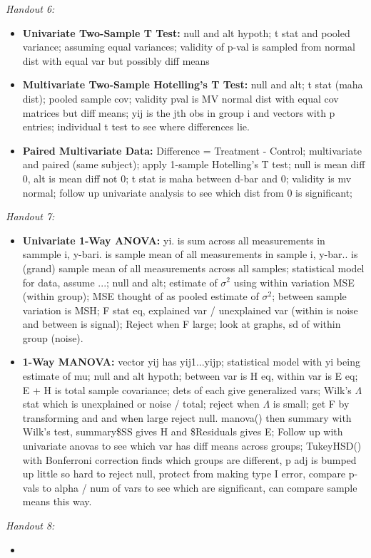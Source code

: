 \documentclass[9pt]{extarticle}
\begin{document}
\textit{Handout 6:}
\begin{itemize}
    \item \textbf{Univariate Two-Sample T Test:} null and alt hypoth; t stat and 
    pooled variance; assuming equal variances; validity of p-val is sampled from 
    normal dist with equal var but possibly diff means
    \item \textbf{Multivariate Two-Sample Hotelling's T Test:} null and alt; 
    t stat (maha dist); pooled sample cov; validity pval is MV normal dist with 
    equal cov matrices but diff means; yij is the jth obs in group i and vectors 
    with p entries; individual t test to see where differences lie.
    \item \textbf{Paired Multivariate Data:} Difference = Treatment - Control;
    multivariate and paired (same subject); apply 1-sample Hotelling's T test; 
    null is mean diff 0, alt is mean diff not 0; t stat is maha between d-bar 
    and 0; validity is mv normal; follow up univariate analysis to see which 
    dist from 0 is significant;
\end{itemize}

\textit{Handout 7:}
\begin{itemize}
    \item \textbf{Univariate 1-Way ANOVA:} yi. is sum across all measurements 
    in sammple i, y-bari. is sample mean of all measurements in sample i, 
    y-bar.. is (grand) sample mean of all measurements across all samples; 
    statistical model for data, assume ...; null and alt; estimate of $\sigma^2$ 
    using within variation MSE (within group); MSE thought of as pooled estimate 
    of $\sigma^2$; between sample variation is MSH; F stat eq, explained var / 
    unexplained var (within is noise and between is signal); Reject when F 
    large; look at graphs, sd of within group (noise).
    \item \textbf{1-Way MANOVA:} vector yij has yij1...yijp; statistical model 
    with yi being estimate of mu; null and alt hypoth; between var is H eq, 
    within var is E eq; E + H is total sample covariance; dets of each give 
    generalized vars; Wilk's $\Lambda$ stat which is unexplained or noise / 
    total; reject when $\Lambda$ is small; get F by transforming and and when 
    large reject null. manova() then summary with Wilk's test, summary\$SS gives 
    H and \$Residuals gives E; Follow up with univariate anovas to see which 
    var has diff means across groups; TukeyHSD() with Bonferroni correction 
    finds which groups are different, p adj is bumped up little so hard to 
    reject null, protect from making type I error, compare p-vals to alpha /
    num of vars to see which are significant, can compare sample means this way.
\end{itemize}

\textit{Handout 8:}
\begin{itemize}
    \item 
\end{itemize}
\end{document}
